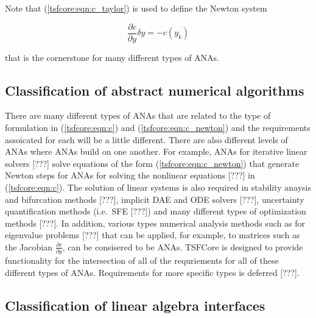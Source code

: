 \documentclass[10pt,fleqn]{article}
\begin{document}
Note that (\ref{tsfcore:eqn:c_taylor}) is used to define the 
Newton system

\begin{equation}
\frac{\partial c}{\partial y} \delta y = - c(y_k)
\label{tsfcore:eqn:c_newton}
\end{equation}

that is the cornerstone for many different types of ANAs.

%
\subsection{Classification of abstract numerical algorithms}
\label{tsfcore:sec:classification_of_ANAs}
%

There are many different types of ANAs that are related to the type of
formulation in (\ref{tsfcore:eqn:c}) and (\ref{tsfcore:eqn:c_newton})
and the requirements assoicated for each will be a little different.
There are also different levels of ANAs where ANAs build on one
another.  For example, ANAs for iterative linear solvers [???] solve
equations of the form (\ref{tsfcore:eqn:c_newton}) that generate
Newton steps for ANAs for solving the nonlinear equations [???] in
(\ref{tsfcore:eqn:c}).  The solution of linear systems is also
required in stability anaysis and bifurcation methods [???], implicit
DAE and ODE solvers [???], uncertainty quantification methods
(i.e.~SFE [???]) and many different types of optimization methods
[???].  In addition, various types numerical analysis methods such as
for eigenvalue problems [???] that can be applied, for example, to
matrices such as the Jacobian $\frac{\partial c}{\partial y}$, can be
consisered to be ANAs.  TSFCore is designed to provide functionality
for the intersection of all of the requriements for all of these
different types of ANAs.  Requirements for more specific types is
deferred [???].

%
\subsection{Classification of linear algebra interfaces}
\label{tsfcore:sec:classification_of_lin_alg_itfc}
%
\end{document}
